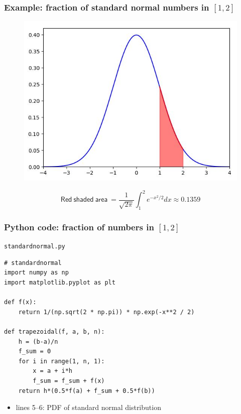 \documentclass[english,14pt]{beamer}
\begin{document}

\begin{frame}[fragile]

\frametitle{Example: fraction of standard normal numbers in $[1,2]$}

\vspace*{-2mm}
\begin{figure}[ht]
	\centering
	\includegraphics[width=.6\textwidth]{figures/stdnormal_12}
\end{figure}
\vspace*{-3mm}
\[
\mathsf{Red~shaded~area~} = \frac{1}{\sqrt{2\pi}} \int_1^2 e^{-x^2/2} dx \approx 0.1359
\]

\end{frame}


\begin{frame}[fragile]

\frametitle{Python code: fraction of numbers in $[1,2]$}

\texttt{standardnormal.py}
\begin{lstlisting}[style=CStyle,basicstyle=\scriptsize]
# standardnormal
import numpy as np
import matplotlib.pyplot as plt

def f(x):
    return 1/(np.sqrt(2 * np.pi)) * np.exp(-x**2 / 2)

def trapezoidal(f, a, b, n):
    h = (b-a)/n
    f_sum = 0
    for i in range(1, n, 1):
        x = a + i*h
        f_sum = f_sum + f(x)
    return h*(0.5*f(a) + f_sum + 0.5*f(b))
\end{lstlisting}

\begin{itemize}
	\item lines 5--6: PDF of standard normal distribution
\end{itemize}

\end{frame}
\end{document}
